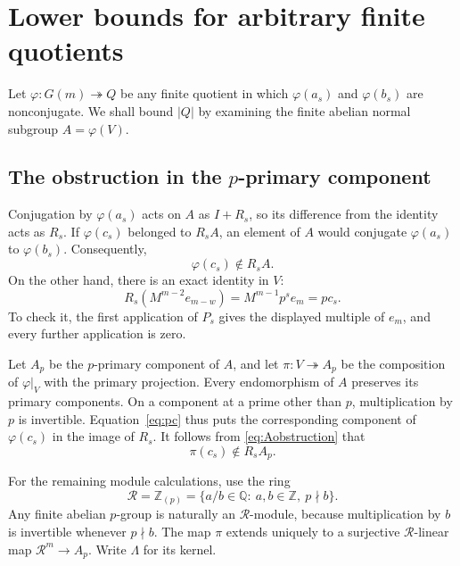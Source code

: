 \documentclass[11pt]{article}
\numberwithin{equation}{section}
\theoremstyle{remark}
\newcommand{\Z}{\mathbb Z}
\newcommand{\Q}{\mathbb Q}
\begin{document}
\section{Lower bounds for arbitrary finite quotients}\label{sec:quotients}

Let $\varphi:G(m)\twoheadrightarrow Q$ be any finite quotient in which
$\varphi(a_s)$ and $\varphi(b_s)$ are nonconjugate. We shall bound
$|Q|$ by examining the finite abelian normal subgroup
$A=\varphi(V)$.

\subsection{The obstruction in the \texorpdfstring{$p$}{p}-primary component}

Conjugation by $\varphi(a_s)$ acts on $A$ as $I+R_s$, so its
difference from the identity acts as $R_s$. If $\varphi(c_s)$ belonged
to $R_sA$, an element of $A$ would conjugate $\varphi(a_s)$ to
$\varphi(b_s)$. Consequently,
\begin{equation}\label{eq:Aobstruction}
 \varphi(c_s)\notin R_sA.
\end{equation}
On the other hand, there is an exact identity in $V$:
\begin{equation}\label{eq:pc}
 R_s(M^{m-2}e_{m-w})=M^{m-1}p^s e_m=p c_s.
\end{equation}
To check it, the first application of $P_s$ gives the displayed
multiple of $e_m$, and every further application is zero.

Let $A_p$ be the $p$-primary component of $A$, and let
$\pi:V\twoheadrightarrow A_p$ be the composition of $\varphi|_V$
with the primary projection. Every endomorphism of $A$ preserves its
primary components. On a component at a prime other than $p$,
multiplication by $p$ is invertible. Equation~\eqref{eq:pc} thus puts
the corresponding component of $\varphi(c_s)$ in the image of $R_s$.
It follows from \eqref{eq:Aobstruction} that
\begin{equation}\label{eq:pobstruction}
 \pi(c_s)\notin R_sA_p.
\end{equation}

For the remaining module calculations, use the ring
\[
 \mathcal R=\Z_{(p)}
 =\{a/b\in\Q:\ a,b\in\Z,\ p\nmid b\}.
\]
Any finite abelian $p$-group is naturally an $\mathcal R$-module,
because multiplication by $b$ is invertible whenever $p\nmid b$.
The map $\pi$ extends uniquely to a surjective $\mathcal R$-linear map
$\mathcal R^m\to A_p$. Write $\Lambda$ for its kernel.
\end{document}
